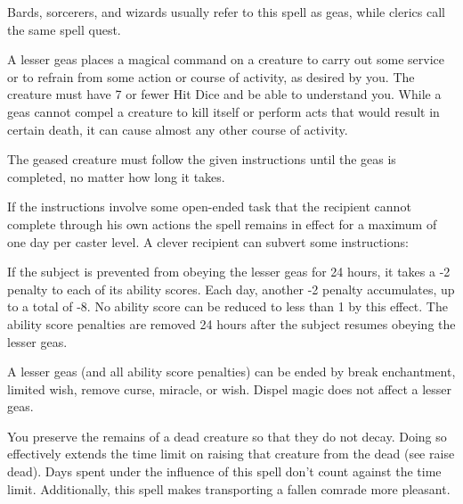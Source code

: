 \begin{multicols}{2}
\begin{small}
\smallskip\noindent Bards, sorcerers, and wizards usually refer to this spell as geas, while clerics call the same spell quest.

\noindent A lesser geas places a magical command on a creature to carry out some service or to refrain from some action or course of activity, as desired by you. The creature must have 7 or fewer Hit Dice and be able to understand you. While a geas cannot compel a creature to kill itself or perform acts that would result in certain death, it can cause almost any other course of activity.

\smallskip\noindent The geased creature must follow the given instructions until the geas is completed, no matter how long it takes.

\smallskip\noindent If the instructions involve some open-ended task that the recipient cannot complete through his own actions the spell remains in effect for a maximum of one day per caster level. A clever recipient can subvert some instructions:

\smallskip\noindent If the subject is prevented from obeying the lesser geas for 24 hours, it takes a -2 penalty to each of its ability scores. Each day, another -2 penalty accumulates, up to a total of -8. No ability score can be reduced to less than 1 by this effect. The ability score penalties are removed 24 hours after the subject resumes obeying the lesser geas.

\smallskip\noindent A lesser geas (and all ability score penalties) can be ended by break enchantment, limited wish, remove curse, miracle, or wish. Dispel magic does not affect a lesser geas.

\noindent You preserve the remains of a dead creature so that they do not decay. Doing so effectively extends the time limit on raising that creature from the dead (see raise dead). Days spent under the influence of this spell don't count against the time limit. Additionally, this spell makes transporting a fallen comrade more pleasant.


\end{small}
\end{multicols}
